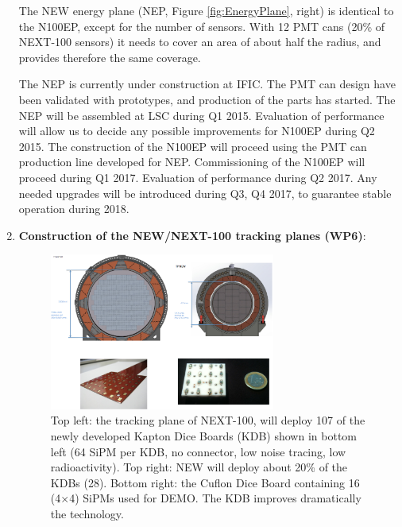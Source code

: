 \begin{enumerate}
The NEW energy plane (NEP, Figure \ref{fig:EnergyPlane}, right) is identical to the N100EP, except for the number of sensors. With 12 PMT cans (20\% of NEXT-100 sensors) it needs to cover an area of about half the radius, and provides therefore the same coverage. 

The NEP is currently under construction at IFIC. The PMT can design have been validated with prototypes, and production of the parts has started. The NEP will be assembled at LSC during Q1 2015. Evaluation of performance will allow us to decide any possible improvements for N100EP during Q2 2015. The construction of the N100EP will proceed using the PMT can production line developed for NEP. Commissioning of the N100EP will proceed during Q1 2017. Evaluation of performance during Q2 2017. Any needed upgrades will be introduced during Q3, Q4 2017, to guarantee stable operation during 2018. 

%

\item  {\bf  Construction of the NEW/NEXT-100 tracking planes (WP6)}:

\begin{figure}[tbhp!]
\begin{center}
\includegraphics[width=0.7\textwidth]{img/TPNext-100.png}
\end{center}
\caption{Top left: the tracking plane of NEXT-100, will deploy 107 of the newly developed Kapton Dice Boards (KDB) shown in bottom left (64 SiPM per KDB, no connector, low noise tracing, low radioactivity). Top right: NEW will deploy about 20\% of the KDBs (28). Bottom right: the Cuflon Dice Board containing 16 (4$\times$4) SiPMs used for DEMO. The KDB improves dramatically the technology.} 
\label{fig.db2}
\end{figure}


\end{enumerate}
